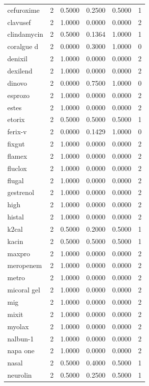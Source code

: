 \begin{longtable}{p{3.0cm}rrrrr}
cefuroxime & 2 & 0.5000 & 0.2500 & 0.5000 & 1 \\
clavusef & 2 & 1.0000 & 0.0000 & 0.0000 & 2 \\
clindamycin & 2 & 0.5000 & 0.1364 & 1.0000 & 1 \\
coralgue d & 2 & 0.0000 & 0.3000 & 1.0000 & 0 \\
denixil & 2 & 1.0000 & 0.0000 & 0.0000 & 2 \\
dexilend & 2 & 1.0000 & 0.0000 & 0.0000 & 2 \\
dinovo & 2 & 0.0000 & 0.7500 & 1.0000 & 0 \\
esprozo & 2 & 1.0000 & 0.0000 & 0.0000 & 2 \\
estes & 2 & 1.0000 & 0.0000 & 0.0000 & 2 \\
etorix & 2 & 0.5000 & 0.5000 & 0.5000 & 1 \\
ferix-v & 2 & 0.0000 & 0.1429 & 1.0000 & 0 \\
fixgut & 2 & 1.0000 & 0.0000 & 0.0000 & 2 \\
flamex & 2 & 1.0000 & 0.0000 & 0.0000 & 2 \\
fluclox & 2 & 1.0000 & 0.0000 & 0.0000 & 2 \\
flugal & 2 & 1.0000 & 0.0000 & 0.0000 & 2 \\
gestrenol & 2 & 1.0000 & 0.0000 & 0.0000 & 2 \\
high & 2 & 1.0000 & 0.0000 & 0.0000 & 2 \\
histal & 2 & 1.0000 & 0.0000 & 0.0000 & 2 \\
k2cal & 2 & 0.5000 & 0.2000 & 0.5000 & 1 \\
kacin & 2 & 0.5000 & 0.5000 & 0.5000 & 1 \\
maxpro & 2 & 1.0000 & 0.0000 & 0.0000 & 2 \\
meropenem & 2 & 1.0000 & 0.0000 & 0.0000 & 2 \\
metro & 2 & 1.0000 & 0.0000 & 0.0000 & 2 \\
micoral gel & 2 & 1.0000 & 0.0000 & 0.0000 & 2 \\
mig & 2 & 1.0000 & 0.0000 & 0.0000 & 2 \\
mixit & 2 & 1.0000 & 0.0000 & 0.0000 & 2 \\
myolax & 2 & 1.0000 & 0.0000 & 0.0000 & 2 \\
nalbun-1 & 2 & 1.0000 & 0.0000 & 0.0000 & 2 \\
napa one & 2 & 1.0000 & 0.0000 & 0.0000 & 2 \\
nasal & 2 & 0.5000 & 0.4000 & 0.5000 & 1 \\
neurolin & 2 & 0.5000 & 0.2500 & 0.5000 & 1 \\

\end{longtable}
